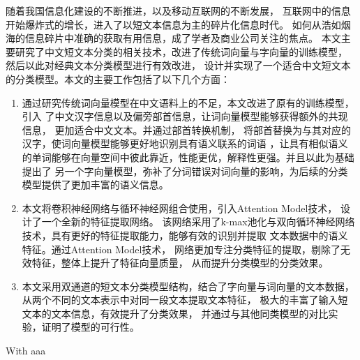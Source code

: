 \begin{chineseabstract}
随着我国信息化建设的不断推进，以及移动互联网的不断发展，
互联网中的信息开始爆炸式的增长，进入了以短文本信息为主的碎片化信息时代。
如何从浩如烟海的信息碎片中准确的获取有用信息，成了学者及商业公司关注的焦点。
本文主要研究了中文短文本分类的相关技术，改进了传统词向量与字向量的训练模型，
然后以此对经典文本分类模型进行有效改进，
设计并实现了一个适合中文短文本的分类模型。本文的主要工作包括了以下几个方面：
\begin{enumerate}
    \item 通过研究传统词向量模型在中文语料上的不足，本文改进了原有的训练模型，引入
    了中文汉字信息以及偏旁部首信息，让词向量模型能够获得额外的共现信息，
    更加适合中文文本。并通过部首转换机制，
    将部首替换为与其对应的汉字，使词向量模型能够更好地识别具有语义联系的词语
    ，让具有相似语义的单词能够在向量空间中彼此靠近，性能更优，解释性更强。并且以此为基础提出了
    另一个字向量模型，弥补了分词错误对词向量的影响，为后续的分类模型提供了更加丰富的语义信息。
    \item 本文将卷积神经网络与循环神经网组合使用，引入Attention Model技术，
    设计了一个全新的特征提取网络。
    该网络采用了k-max池化与双向循环神经网络技术，具有更好的特征提取能力，能够有效的识别并提取
    文本数据中的语义特征。通过Attention Model技术，
    网络更加专注分类特征的提取，剔除了无效特征，整体上提升了特征向量质量，
    从而提升分类模型的分类效果。
    \item 本文采用双通道的短文本分类模型结构，结合了字向量与词向量的文本数据，
    从两个不同的文本表示中对同一段文本提取文本特征，
    极大的丰富了输入短文本的文本信息，有效提升了分类效果，
    并通过与其他同类模型的对比实验，证明了模型的可行性。
\end{enumerate}


\end{chineseabstract}



\begin{englishabstract}
With aaa

\end{englishabstract}
    